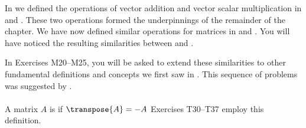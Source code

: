 %
%
In  we defined the operations of vector addition and vector  scalar multiplication in  and .  These two operations formed the underpinnings of the remainder of the chapter.  We have now defined similar operations for matrices in  and .  You will have noticed the resulting similarities between  and .\par
%
In Exercises M20--M25, you will be asked to extend these similarities to other fundamental definitions and concepts we first saw in .  This sequence of problems was suggested by \martinjackson.\\\\
%
%
%
A matrix $A$ is  if $\transpose{A}=-A$  Exercises T30--T37 employ this definition.\\\\






